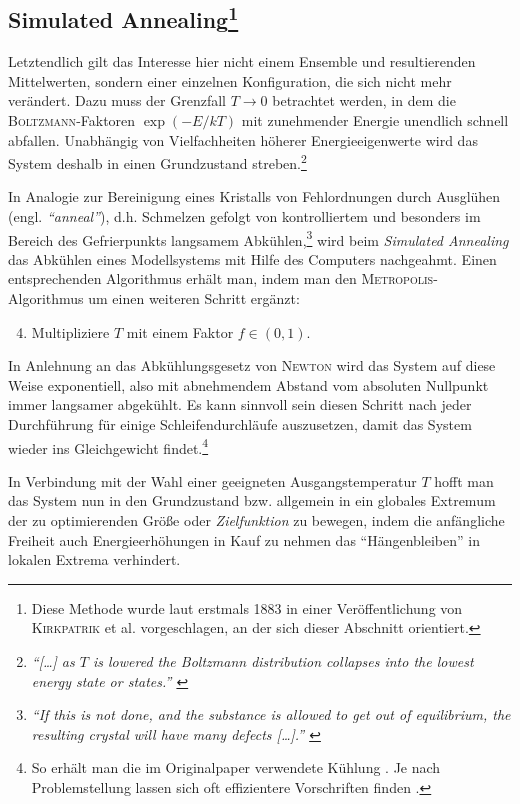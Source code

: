 \documentclass[a4paper, 10pt, twoside, openany]{book} %
\begin{document}
\subsection[Simulated Annealing]{Simulated Annealing\footnote{Diese Methode wurde laut \cite[Einleitung]{vanLaarhoven} erstmals 1883 in einer Veröffentlichung von \textsc{Kirkpatrik} et al. \cite{Kirkpatrick} vorgeschlagen, an der sich dieser Abschnitt orientiert.}}

Letztendlich gilt das Interesse hier nicht einem Ensemble und resultierenden Mittelwerten, sondern einer einzelnen Konfiguration, die sich nicht mehr verändert. Dazu muss der Grenzfall $T \rightarrow 0$ betrachtet werden, in dem die \textsc{Boltzmann}-Faktoren $\exp(-E / k T)$ mit zunehmender Energie unendlich schnell abfallen. Unabhängig von Vielfachheiten höherer Energieeigenwerte wird das System deshalb in einen Grundzustand streben.\footnote{\emph{"`\emph{[\dots]} as $T$ is lowered the Boltzmann distribution collapses into the lowest energy state or states."' \cite[S.~672]{Kirkpatrick}}}

In Analogie zur Bereinigung eines Kristalls von Fehlordnungen durch Ausglühen (engl. \emph{"`anneal"'}), d.h. Schmelzen gefolgt von kontrolliertem und besonders im Bereich des Gefrierpunkts langsamem Abkühlen,\footnote{\emph{"`If this is not done, and the substance is allowed to get out of equilibrium, the resulting crystal will have many defects \emph{[\dots]}."' \cite[S.~672]{Kirkpatrick}}} wird beim \emph{Simulated Annealing} das Abkühlen eines Modellsystems mit Hilfe des Computers nachgeahmt. Einen entsprechenden Algorithmus erhält man, indem man den \textsc{Metropolis}-Algorithmus um einen weiteren Schritt ergänzt:
%
\begin{enumerate}
    \setcounter{enumi}{3}
    \item Multipliziere $T$ mit einem Faktor $f \in (0, 1)$.
\end{enumerate}
%
In Anlehnung an das Abkühlungsgesetz von \textsc{Newton} wird das System auf diese Weise exponentiell, also mit abnehmendem Abstand vom absoluten Nullpunkt immer langsamer abgekühlt. Es kann sinnvoll sein diesen Schritt nach jeder Durchführung für einige Schleifendurchläufe auszusetzen, damit das System wieder ins Gleichgewicht findet.\footnote{So erhält man die im Originalpaper verwendete Kühlung \cite[S.~675]{Kirkpatrick}. Je nach Problemstellung lassen sich oft effizientere Vorschriften finden \cite[S.~59f]{vanLaarhoven}.}

In Verbindung mit der Wahl einer geeigneten Ausgangstemperatur $T$ hofft man das System nun in den Grundzustand bzw. allgemein in ein globales Extremum der zu optimierenden Größe oder \emph{Zielfunktion} zu bewegen, indem die anfängliche Freiheit auch Energieerhöhungen in Kauf zu nehmen das "`Hängenbleiben"' in lokalen Extrema verhindert.
\end{document}
